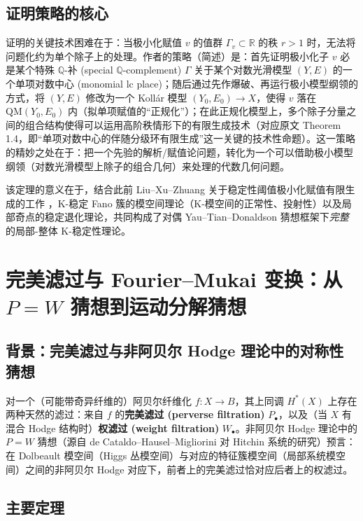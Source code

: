 \documentclass[11pt,a4paper]{article}
\theoremstyle{definition}
\theoremstyle{remark}
\newcommand{\Q}{\mathbb{Q}}
\newcommand{\R}{\mathbb{R}}
\begin{document}
\subsection{证明策略的核心}

证明的关键技术困难在于：当极小化赋值 $v$ 的值群 $\Gamma_v \subset \R$ 的秩 $r > 1$ 时，无法将问题化约为单个除子上的处理。作者的策略（简述）是：首先证明极小化子 $v$ 必是某个特殊 $\Q$-补 (special $\Q$-complement) $\Gamma$ 关于某个对数光滑模型 $(Y,E)$ 的一个单项对数中心 (monomial lc place)；随后通过先作爆破、再运行极小模型纲领的方式，将 $(Y,E)$ 修改为一个 Kollár 模型 $(Y_0, E_0) \to X$，使得 $v$ 落在 $\mathrm{QM}(Y_0, E_0)$ 内（拟单项赋值的“正规化”）；在此正规化模型上，多个除子分量之间的组合结构使得可以运用高阶秩情形下的有限生成技术（对应原文 Theorem 1.4，即“单项对数中心的伴随分级环有限生成”这一关键的技术性命题）。这一策略的精妙之处在于：把一个先验的解析/赋值论问题，转化为一个可以借助极小模型纲领（对数光滑模型上除子的组合几何）来处理的代数几何问题。

该定理的意义在于，结合此前 Liu--Xu--Zhuang 关于稳定性阈值极小化赋值有限生成的工作 \cite{LXZ2022}，K-稳定 Fano 簇的模空间理论（K-模空间的正常性、投射性）以及局部奇点的稳定退化理论，共同构成了对偶 Yau--Tian--Donaldson 猜想框架下\emph{完整}的局部-整体 K-稳定性理论。

\section{完美滤过与 Fourier--Mukai 变换：从 $P=W$ 猜想到运动分解猜想}

\subsection{背景：完美滤过与非阿贝尔 Hodge 理论中的对称性猜想}

对一个（可能带奇异纤维的）阿贝尔纤维化 $f: X \to B$，其上同调 $H^*(X)$ 上存在两种天然的滤过：来自 $f$ 的\textbf{完美滤过 (perverse filtration)} $P_\bullet$，以及（当 $X$ 有混合 Hodge 结构时）\textbf{权滤过 (weight filtration)} $W_\bullet$。非阿贝尔 Hodge 理论中的 $P=W$ 猜想（源自 de Cataldo--Hausel--Migliorini 对 Hitchin 系统的研究）预言：在 Dolbeault 模空间（Higgs 丛模空间）与对应的特征簇模空间（局部系统模空间）之间的非阿贝尔 Hodge 对应下，前者上的完美滤过恰对应后者上的权滤过。

\subsection{主要定理}
\end{document}
